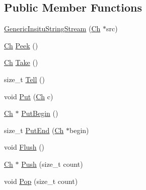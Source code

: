 \subsection*{Public Member Functions}
\begin{DoxyCompactItemize}
\item 
\hyperlink{structGenericInsituStringStream_ad8b8417f0501ac261c7232023292c183}{Generic\+Insitu\+String\+Stream} (\hyperlink{structGenericInsituStringStream_a277308a58f551f11d0d9a20823702b5a}{Ch} $\ast$src)
\item 
\hyperlink{structGenericInsituStringStream_a277308a58f551f11d0d9a20823702b5a}{Ch} \hyperlink{structGenericInsituStringStream_ae21ba3ff4595ccd5caa4a9858e793f3f}{Peek} ()
\item 
\hyperlink{structGenericInsituStringStream_a277308a58f551f11d0d9a20823702b5a}{Ch} \hyperlink{structGenericInsituStringStream_afde4e46663225e4c32cfdbcd261f321e}{Take} ()
\item 
size\+\_\+t \hyperlink{structGenericInsituStringStream_aa9a84abb24e8c93b683a2e7bfea309db}{Tell} ()
\item 
void \hyperlink{structGenericInsituStringStream_a74f92f9a4c34bd65aab4b99f519a543a}{Put} (\hyperlink{structGenericInsituStringStream_a277308a58f551f11d0d9a20823702b5a}{Ch} c)
\item 
\hyperlink{structGenericInsituStringStream_a277308a58f551f11d0d9a20823702b5a}{Ch} $\ast$ \hyperlink{structGenericInsituStringStream_afc671072f56eb6e8d9009061c6565dd4}{Put\+Begin} ()
\item 
size\+\_\+t \hyperlink{structGenericInsituStringStream_a93702b08ff29c66bde389b0d4e9efa5a}{Put\+End} (\hyperlink{structGenericInsituStringStream_a277308a58f551f11d0d9a20823702b5a}{Ch} $\ast$begin)
\item 
void \hyperlink{structGenericInsituStringStream_a53597dc98a03a6a051c37c4f1046bd04}{Flush} ()
\item 
\hyperlink{structGenericInsituStringStream_a277308a58f551f11d0d9a20823702b5a}{Ch} $\ast$ \hyperlink{structGenericInsituStringStream_af91a643e5a93292bc0fbda33320caf20}{Push} (size\+\_\+t count)
\item 
void \hyperlink{structGenericInsituStringStream_ad2c56d9dd64268ad72aab95f981fd761}{Pop} (size\+\_\+t count)
\end{DoxyCompactItemize}
